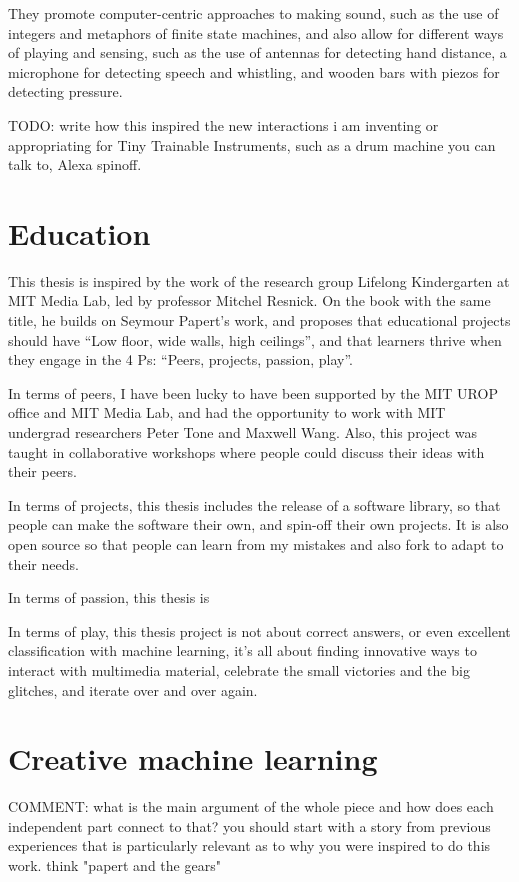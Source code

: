 They promote computer-centric approaches to making sound, such as the use of integers and metaphors of finite state machines, and also allow for different ways of playing and sensing, such as the use of antennas for detecting hand distance, a microphone for detecting speech and whistling, and wooden bars with piezos for detecting pressure.

TODO: write how this inspired the new interactions i am inventing or appropriating for Tiny Trainable Instruments, such as a drum machine you can talk to, Alexa spinoff.

\section{Education}

This thesis is inspired by the work of the research group Lifelong Kindergarten at MIT Media Lab, led by professor Mitchel Resnick. On the book with the same title, he builds on Seymour Papert’s work, and proposes that educational projects should have “Low floor, wide walls, high ceilings”, and that learners thrive when they engage in the 4 Ps: “Peers, projects, passion, play”.

In terms of peers, I have been lucky to have been supported by the MIT UROP office and MIT Media Lab, and had the opportunity to work with MIT undergrad researchers Peter Tone and Maxwell Wang. Also, this project was taught in collaborative workshops where people could discuss their ideas with their peers.

In terms of projects, this thesis includes the release of a software library, so that people can make the software their own, and spin-off their own projects. It is also open source so that people can learn from my mistakes and also fork to adapt to their needs.

In terms of passion, this thesis is 

In terms of play, this thesis project is not about correct answers, or even excellent classification with machine learning, it's all about finding innovative ways to interact with multimedia material, celebrate the small victories and the big glitches, and iterate over and over again.

\section{Creative machine learning}

COMMENT: what is the main argument of the whole piece and how does each independent part connect to that? you should start with a story from previous experiences that is particularly relevant as to why you were inspired to do this work. think "papert and the gears"

